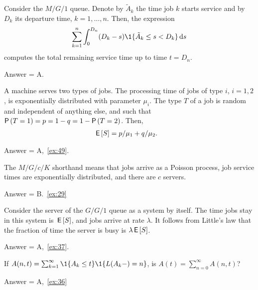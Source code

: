\begin{exercise}[201903]
Consider the $M/G/1$ queue. Denote by $\tilde{A}_k$ the time job $k$ starts service and by $D_k$ its departure time, $k=1,\ldots,n$. Then, the expression
\begin{equation*}
\sum_{k=1}^{n} \int_0^{D_n} (D_k-s)\1{\tilde A_k \leq s < D_k} \d s
\end{equation*}
computes the total remaining service time up to time $t = D_n$.
\begin{solution}
Answer = A.
\end{solution}
\end{exercise}

\begin{exercise}[201904]
  A machine serves two types of jobs.
  The processing time of jobs of type $i$, $i=1,2$, is exponentially distributed with parameter $\mu_i$.
  The type $T$ of a job is random and independent of anything else, and such that $\P{T=1} = p = 1-q = 1-\P{T=2}$. Then,
\begin{align*}
  \,\mathsf{E}\left[S\right] &= p/\mu_1 + q/\mu_2.
  \end{align*}
\begin{solution}
Answer = A,~\cref{ex:49}.
\end{solution}
\end{exercise}

\begin{exercise}[201904]
The  $M/G/c/K$ shorthand means that jobs arrive as a Poisson process, job service times are exponentially distributed, and there are $c$ servers.
\begin{solution} Answer = B.~\cref{ex:29}
\end{solution}
\end{exercise}


\begin{exercise}[201904]
 Consider the server of the $G/G/1$ queue as a system by itself.
  The time jobs stay in this system is $\,\mathsf{E}\left[S\right]$, and jobs arrive at rate $\lambda$.
  It follows from Little's law that the fraction of time the server is busy is $\lambda \,\mathsf{E}\left[S\right]$.
\begin{solution} Answer = A,~\cref{ex:37}.
\end{solution}
\end{exercise}

\begin{exercise}[201904]
 If   $A(n,t) = \sum_{k=1}^\infty \1{A_k \leq t}\1{L(A_k-) = n}$, is  $A(t) =\sum_{n=0}^\infty A(n,t)$?
\begin{solution} Answer = A,~\cref{ex:36}
\end{solution}
\end{exercise}

